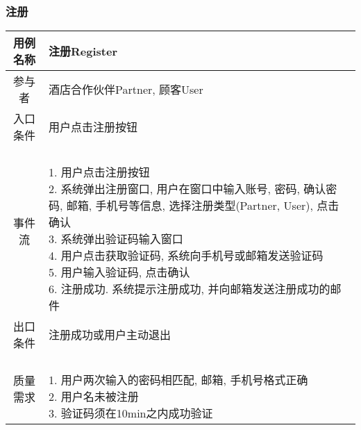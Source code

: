 \documentclass[11pt]{article}
\begin{document}
		\subsubsection{注册}
			\begin{tabular}{c|l}
			\hline
			用例名称 & 注册Register \\ \hline
			参与者 & 酒店合作伙伴Partner, 顾客User  \\ \hline
			入口条件 & 用户点击注册按钮 \\ \hline
			事件流 & 	\parbox{33em}{\ \\
						1. 用户点击注册按钮 \\
						2. 系统弹出注册窗口, 用户在窗口中输入账号, 密码, 确认密码, 邮箱, 手机号等信息, 选择注册类型(Partner, User), 点击确认  \\
						3. 系统弹出验证码输入窗口 \\
						4. 用户点击获取验证码, 系统向手机号或邮箱发送验证码 \\
						5. 用户输入验证码, 点击确认 \\
						6. 注册成功. 系统提示注册成功, 并向邮箱发送注册成功的邮件 \\
						} \\ \hline
			出口条件 & 注册成功或用户主动退出 \\ \hline
			质量需求 & \parbox{33em}{\ \\
						1. 用户两次输入的密码相匹配, 邮箱, 手机号格式正确 \\ 
						2. 用户名未被注册 \\
						3. 验证码须在10min之内成功验证 \\
						} \\ \hline
			\end{tabular}

		
		
\end{document}
